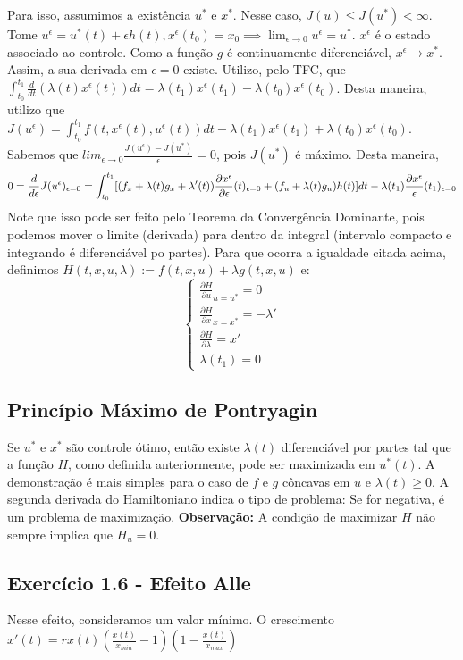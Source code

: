 Para isso, assumimos a existência $u^*$ e $x^*$. Nesse caso, $J(u) \leq J(u^*) < \infty$. Tome $u^{\epsilon} = u^{*}(t) + \epsilon h(t), x^{\epsilon}(t_0) = x_0 \implies \lim_{\epsilon\to 0} u^{\epsilon} = u^{*}$. $x^{\epsilon}$ é o estado associado ao controle. Como a função $g$ é continuamente diferenciável, $x^{\epsilon} \to x^{*}$. Assim, a sua derivada em $\epsilon = 0$ existe. Utilizo, pelo TFC, que $\int_{t_0}^{t_1} \frac{d}{dt}(\lambda (t)x^{\epsilon}(t))dt = \lambda(t_1)x^{\epsilon}(t_1) - \lambda(t_0)x^{\epsilon}(t_0)$. Desta maneira, utilizo que $J(u^{\epsilon}) = \int_{t_0}^{t_1} f(t,x^{\epsilon}(t),u^{\epsilon}(t))dt - \lambda(t_1)x^{\epsilon}(t_1) + \lambda(t_0)x^{\epsilon}(t_0)$. Sabemos que $lim_{\epsilon \to 0} \frac{J(u^{\epsilon}) - J(u^{*})}{\epsilon} = 0$, pois $J(u^*)$ é máximo. Desta maneira, 
\begin{equation} \label{eq1}
0 = \frac{d}{d\epsilon} J(u^{\epsilon})_{\epsilon = 0} = \int_{t_0}^{t_1} [(f_x + \lambda(t)g_x + \lambda '(t))\frac{\partial x^{\epsilon}}{\partial\epsilon}(t)_{\epsilon = 0} + (f_u + \lambda(t)g_u)h(t)]dt - \lambda(t_1)\frac{\partial x^{\epsilon}}{\epsilon}(t_1)_{\epsilon = 0}
\end{equation}
Note que isso pode ser feito pelo Teorema da Convergência Dominante, pois podemos mover o limite (derivada) para dentro da integral (intervalo compacto e integrando é diferenciável po partes).  Para que ocorra a igualdade citada acima, definimos $H(t,x,u,\lambda) := f(t,x,u) + \lambda g(t,x,u)$ e:
\begin{equation}
\begin{cases}
    \frac{\partial H}{\partial u}_{u = u^{*}} = 0 \\
    \frac{\partial H}{\partial x}_{x = x^*} = - \lambda ' \\
    \frac{\partial H}{\partial \lambda} = x' \\
    \lambda(t_1) = 0 
\end{cases}    
\end{equation}

\subsection{Princípio Máximo de Pontryagin}

Se $u^*$ e $x^*$ são controle ótimo, então existe $\lambda (t)$ diferenciável por partes tal que a função $H$, como definida anteriormente, pode ser maximizada em $u^*(t)$. A demonstração é mais simples para o caso de $f$ e $g$ côncavas em $u$ e $\lambda (t) \geq 0$. A segunda derivada do Hamiltoniano indica o tipo de problema: Se for negativa, é um problema de maximização. 
\textbf{Observação:} A condição de maximizar $H$ não sempre implica que $H_u = 0$.  

\subsection{Exercício 1.6 - Efeito Alle}

Nesse efeito, consideramos um valor mínimo. O crescimento $x'(t) = rx(t)(\frac{x(t)}{x_{min}} - 1)(1 - \frac{x(t)}{x_{max}})$

